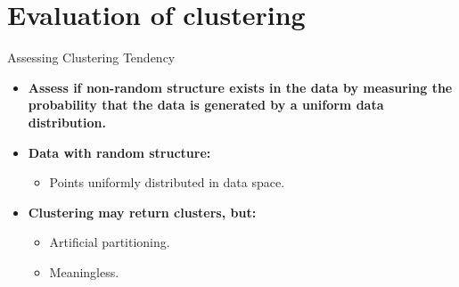 \section{Evaluation of clustering}

\begin{frame}{Assessing Clustering Tendency}
	\begin{itemize}
		\item \textbf{Assess {\color{airforceblue}if non-random structure}
			      exists in the data by measuring the probability that the data is
			      generated by a uniform data distribution.}
		\item \textbf{Data with random structure:}
		      \begin{itemize}
			      \item Points uniformly distributed in data space.
		      \end{itemize}
		\item \textbf{Clustering may return clusters, but:}
		      \begin{itemize}
			      \item Artificial partitioning.
			      \item Meaningless.
		      \end{itemize}
	\end{itemize}
\end{frame}

